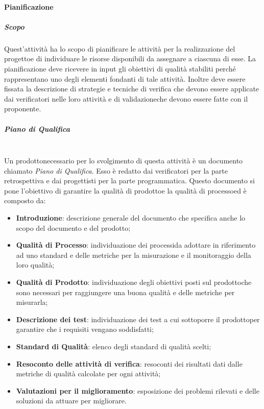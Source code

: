 			\paragraph{Pianificazione}
				\subparagraph*{Scopo}
				Quest'attività ha lo scopo di pianificare le attività per la realizzazione del progetto\glosp e di individuare le risorse disponibili da assegnare a ciascuna di esse.
				La pianificazione deve ricevere in input gli obiettivi di qualità stabiliti perché rappresentano uno degli elementi fondanti di tale attività. Inoltre deve essere fissata la descrizione di strategie e tecniche di verifica che devono essere applicate dai verificatori nelle loro attività e di validazione\glosp che devono essere fatte con il proponente.
				\subparagraph*{Piano di Qualifica}\mbox{}\\ [1mm]
				Un prodotto\glosp necessario per lo svolgimento di questa attività è un documento chiamato \textit{Piano di Qualifica}. Esso è redatto dai verificatori per la parte retrospettiva e dai progettisti per la parte programmatica. Questo documento si pone l'obiettivo di garantire la qualità di prodotto\glosp e la qualità di processo\glosp ed è composto da:
				\begin{itemize}
					\item \textbf{Introduzione}: descrizione generale del documento che specifica anche lo scopo del documento e del prodotto\glo;
					\item \textbf{Qualità di Processo}\glo: individuazione dei processi\glosp da adottare in riferimento ad uno standard e delle metriche per la misurazione e il monitoraggio della loro qualità;
					\item \textbf{Qualità di Prodotto}\glo: individuazione degli obiettivi posti sul prodotto\glosp che sono necessari per raggiungere una buona qualità e delle metriche per misurarla;
					\item \textbf{Descrizione dei test}: individuazione dei test a cui sottoporre il prodotto\glosp per garantire che i requisiti vengano soddisfatti;
					\item \textbf{Standard di Qualità}: elenco degli standard di qualità scelti;
					\item \textbf{Resoconto delle attività di verifica}: resoconti dei risultati dati dalle metriche di qualità calcolate per ogni attività;
					\item \textbf{Valutazioni per il miglioramento}: esposizione dei problemi rilevati e delle soluzioni da attuare per migliorare.
				\end{itemize}
